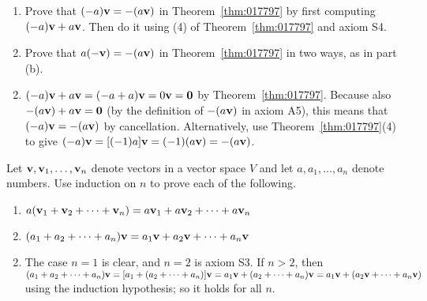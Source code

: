 \begin{multicols}{2}
\begin{ex}
\begin{enumerate}[label={\alph*.}]
\item Prove that $(-a)\textbf{v} = -(a\textbf{v})$ in Theorem~\ref{thm:017797} by first computing $(-a)\textbf{v} + a\textbf{v}$. Then do it using (4) of Theorem~\ref{thm:017797} and axiom S4.

\item Prove that $a(-\textbf{v}) = -(a\textbf{v})$ in Theorem~\ref{thm:017797} in two ways, as in part (b).

\end{enumerate}
\begin{sol}
\begin{enumerate}[label={\alph*.}]
\setcounter{enumi}{1}
\item  $(-a)\textbf{v} + a\textbf{v} = (-a + a)\textbf{v} = 0\textbf{v} = \textbf{0}$ by Theorem~\ref{thm:017797}. Because also $-(a\textbf{v}) + a\textbf{v} = \textbf{0}$ (by the definition of $-(a\textbf{v})$ in axiom A5), this means that $(-a)\textbf{v} = -(a\textbf{v})$ by cancellation. Alternatively, use Theorem~\ref{thm:017797}(4) to give $(-a)\textbf{v} = [(-1)a]\textbf{v} = (-1)(a\textbf{v}) = -(a\textbf{v})$.

\end{enumerate}
\end{sol}
\end{ex}

\begin{ex}
\label{ex:6_1_13}
Let $\textbf{v}, \textbf{v}_{1}, \dots, \textbf{v}_{n}$ denote vectors in a vector space $V$ and let $a, a_{1}, \dots, a_{n}$ denote numbers. Use induction on $n$ to prove each of the following.

\begin{enumerate}[label={\alph*.}]
\item $a(\textbf{v}_{1} + \textbf{v}_{2} + \dots + \textbf{v}_{n}) = a\textbf{v}_{1} + a\textbf{v}_{2} + \dots + a\textbf{v}_{n}$

\item $(a_{1} + a_{2} + \dots + a_{n})\textbf{v} = a_{1}\textbf{v} + a_{2}\textbf{v} + \dots + a_{n}\textbf{v}$

\end{enumerate}
\begin{sol}
\begin{enumerate}[label={\alph*.}]
\setcounter{enumi}{1}
\item  The case $n = 1$ is clear, and $n = 2$ is axiom S3. If $n > 2$, then $(a_{1} + a_{2} + \dots + a_{n})\textbf{v} = [a_{1} + (a_{2} + \dots + a_{n})]\textbf{v} = a_{1}\textbf{v} + (a_{2} + \dots + a_{n})\textbf{v} = a_{1}\textbf{v} + (a_{2}\textbf{v} + \dots + a_{n}\textbf{v})$ using the induction hypothesis; so it holds for all $n$.


\end{enumerate}
\end{sol}
\end{ex}
\end{multicols}

